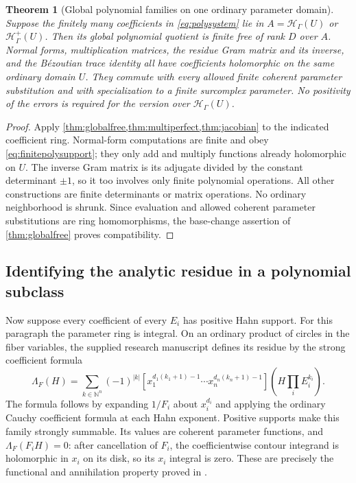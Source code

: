 \documentclass[11pt,letterpaper,oneside]{article}
\numberwithin{equation}{section}
\newtheorem{theorem}{Theorem}[section]
\theoremstyle{definition}
\theoremstyle{remark}\newtheorem{remark}[theorem]{Remark}
\newcommand{\N}{\mathbb N}\newcommand{\Z}{\mathbb Z}
\newcommand{\HH}{\mathcal H_\Gamma}\newcommand{\Hp}{\mathcal H^+_\Gamma}
\begin{document}
\begin{theorem}[Global polynomial families on one ordinary parameter domain]\label{thm:polyparameters}
Suppose the finitely many coefficients in \eqref{eq:polysystem} lie in
$A=\HH(U)$ or $\Hp(U)$. Then its global polynomial quotient is finite
free of rank $D$ over $A$. Normal forms, multiplication matrices, the
residue Gram matrix and its inverse, and the B\'ezoutian trace identity
all have coefficients holomorphic on the same ordinary domain $U$.
They commute with every allowed finite coherent parameter substitution
and with specialization to a finite surcomplex parameter.
No positivity of the errors is required for the version over $\HH(U)$.
\end{theorem}
\begin{proof}
Apply \cref{thm:globalfree,thm:multiperfect,thm:jacobian} to the indicated
coefficient ring. Normal-form computations are finite and obey
\eqref{eq:finitepolysupport}; they only add and multiply functions already
holomorphic on $U$. The inverse Gram matrix is its adjugate divided by
the constant determinant $\pm1$, so it too involves only finite polynomial
operations. All other constructions are finite determinants or matrix
operations. No ordinary neighborhood is shrunk. Since evaluation and
allowed coherent parameter substitutions are ring homomorphisms, the
base-change assertion of \cref{thm:globalfree} proves compatibility.
\end{proof}

\subsection{Identifying the analytic residue in a polynomial subclass}
Now suppose every coefficient of every $E_i$ has positive Hahn support.
For this paragraph the parameter ring is integral. On an ordinary product
of circles in the fiber variables, the supplied research manuscript defines
its residue by the strong coefficient formula
\begin{equation}\label{eq:sourceLambda}
 \Lambda_F(H)=\sum_{k\in\N^n}(-1)^{|k|}
 \left[x_1^{d_1(k_1+1)-1}\cdots x_n^{d_n(k_n+1)-1}\right]
 \left(H\prod_i E_i^{k_i}\right).
\end{equation}
The formula follows by expanding $1/F_i$ about $x_i^{d_i}$ and applying
the ordinary Cauchy coefficient formula at each Hahn exponent. Positive
supports make this family strongly summable. Its values are coherent
parameter functions, and $\Lambda_F(F_iH)=0$: after cancellation of
$F_i$, the coefficientwise contour integrand is holomorphic in $x_i$
on its disk, so its $x_i$ integral is zero. These are precisely the
functional and annihilation property proved in \cite{SourceResearch}.
\end{document}
